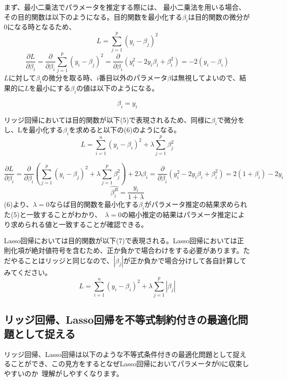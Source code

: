 \documentclass[uplatex]{jsarticle}
\begin{document}
まず、最小二乗法でパラメータを推定する際には、
最小二乗法を用いる場合、その目的関数は以下のようになる。目的関数を最小化する$\beta_i$は目的関数の微分が0になる時となるため、
\begin{equation}
  L = \sum_{j = 1}^p(y_i - \beta_j)^2
\end{equation}
$$\frac{\partial L}{\partial \beta_i} = \frac{\partial}{\partial \beta_i}\sum_{j = 1}^p(y_i - \beta_j)^2 = \frac{\partial}{\partial \beta_i}(y_i^2 - 2y_i\beta_i + \beta_i^2) = -2(y_i - \beta_i)$$
$L$に対して$\beta_i$の微分を取る時、$i$番目以外のパラメータ$\beta$は無視してよいので、結果的に$L$を最小にする$\beta_i$の値は以下のようになる。

\begin{equation}
  \beta_i = y_i
\end{equation}

リッジ回帰においては目的関数が以下(5)で表現されるため、同様に$\beta_i$で微分をし、Lを最小化する$\beta_i$を求めると以下の(6)のようになる。
\begin{equation}
L = \sum_{i=1}^n \left(y_i - \beta_i \right)^2 + \lambda \sum_{j=1}^p \beta_j^2
\end{equation}

$$\frac{\partial L}{\partial \beta_i} = \frac{\partial}{\partial \beta_i}\left(\sum_{j = 1}^p(y_i - \beta_j)^2 +\lambda \sum_{j=1}^p \beta_j^2\right) + 2\lambda\beta_i = \frac{\partial}{\partial \beta_i}(y_i^2 - 2y_i\beta_i + \beta_i^2) = 2(1 + \beta_i) - 2y_i $$
\begin{equation}
  \hat{\beta_i^R} = \frac{y_i}{1 + \lambda}
\end{equation}
(6)より、$\lambda = 0$ならば目的関数を最小化する$\beta_i$がパラメータ推定の結果求められた(5)と一致することがわかり、\
$\lambda = 0$の縮小推定の結果はパラメータ推定により求められる値と一致することが確認できる。

Lasso回帰においては目的関数が以下(7)で表現される。Lasso回帰においては正則化項が絶対値符号を含むため、正か負かで場合わけをする必要があります。ただやることはリッジと同じなので、$|\beta_j|$が正か負かで場合分けして各自計算してみてください。
\begin{equation}
  L = \sum_{i=1}^n \left(y_i - \beta_i \right)^2 + \lambda \sum_{j=1}^p |\beta_j|
\end{equation}

\subsection{リッジ回帰、Lasso回帰を不等式制約付きの最適化問題として捉える}
リッジ回帰、Lasso回帰は以下のような不等式条件付きの最適化問題として捉えることができ、この見方をするとなぜLasso回帰においてパラメータが0に収束しやすいのか\
理解がしやすくなります。
\end{document}
